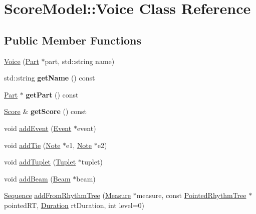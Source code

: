 \hypertarget{classScoreModel_1_1Voice}{}\section{Score\+Model\+::Voice Class Reference}
\label{classScoreModel_1_1Voice}
\subsection*{Public Member Functions}
\begin{DoxyCompactItemize}
\item 
\mbox{\hyperlink{classScoreModel_1_1Voice_a643750fa08c8cbb778e954006f8327ee}{Voice}} (\mbox{\hyperlink{classScoreModel_1_1Part}{Part}} $\ast$part, std\+::string name)
\item 
\mbox{\label{classScoreModel_1_1Voice_a909bca5575124aa265a49b28db2f1ce9}} 
std\+::string {\bfseries get\+Name} () const
\item 
\mbox{\label{classScoreModel_1_1Voice_aef6d564488ba7fd2ca15f270a6c12c74}} 
\mbox{\hyperlink{classScoreModel_1_1Part}{Part}} $\ast$ {\bfseries get\+Part} () const
\item 
\mbox{\label{classScoreModel_1_1Voice_a50befdba4b2f8d031287555f8389a1c7}} 
\mbox{\hyperlink{classScoreModel_1_1Score}{Score}} \& {\bfseries get\+Score} () const
\item 
void \mbox{\hyperlink{classScoreModel_1_1Voice_a69f704500f77554d6f35eb9afa29285d}{add\+Event}} (\mbox{\hyperlink{classScoreModel_1_1Event}{Event}} $\ast$event)
\item 
void \mbox{\hyperlink{classScoreModel_1_1Voice_a93951ee88d70e35ade3febe8c7ed571c}{add\+Tie}} (\mbox{\hyperlink{classScoreModel_1_1Note}{Note}} $\ast$e1, \mbox{\hyperlink{classScoreModel_1_1Note}{Note}} $\ast$e2)
\item 
void \mbox{\hyperlink{classScoreModel_1_1Voice_ad9d6bdd1aab4ed07e52bb5c09924662b}{add\+Tuplet}} (\mbox{\hyperlink{classScoreModel_1_1Tuplet}{Tuplet}} $\ast$tuplet)
\item 
void \mbox{\hyperlink{classScoreModel_1_1Voice_a5e995ab144d0bef4bb7d5c8876662c86}{add\+Beam}} (\mbox{\hyperlink{classScoreModel_1_1Beam}{Beam}} $\ast$beam)
\item 
\mbox{\hyperlink{classScoreModel_1_1Sequence}{Sequence}} \mbox{\hyperlink{classScoreModel_1_1Voice_a30cf5805201179908dee043b23de3d84}{add\+From\+Rhythm\+Tree}} (\mbox{\hyperlink{classScoreModel_1_1Measure}{Measure}} $\ast$measure, const \mbox{\hyperlink{classPointedRhythmTree}{Pointed\+Rhythm\+Tree}} $\ast$pointed\+RT, \mbox{\hyperlink{classScoreModel_1_1Duration}{Duration}} rt\+Duration, int level=0)

\end{DoxyCompactItemize}
